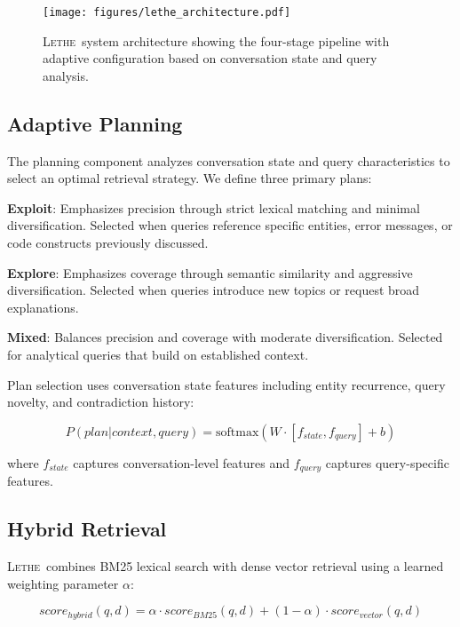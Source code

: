 \documentclass[letterpaper]{article}
\newcommand{\lethe}{\textsc{Lethe}}
\begin{document}
\begin{figure}[t]
\centering
\texttt{[image: figures/lethe\_architecture.pdf]}
\caption{\lethe\ system architecture showing the four-stage pipeline with adaptive configuration based on conversation state and query analysis.}
\label{fig:architecture}
\end{figure}

\subsection{Adaptive Planning}

The planning component analyzes conversation state and query characteristics to select an optimal retrieval strategy. We define three primary plans:

\textbf{Exploit}: Emphasizes precision through strict lexical matching and minimal diversification. Selected when queries reference specific entities, error messages, or code constructs previously discussed.

\textbf{Explore}: Emphasizes coverage through semantic similarity and aggressive diversification. Selected when queries introduce new topics or request broad explanations.

\textbf{Mixed}: Balances precision and coverage with moderate diversification. Selected for analytical queries that build on established context.

Plan selection uses conversation state features including entity recurrence, query novelty, and contradiction history:

\begin{equation}
P(plan | context, query) = \text{softmax}(W \cdot [f_{state}, f_{query}] + b)
\end{equation}

where $f_{state}$ captures conversation-level features and $f_{query}$ captures query-specific features.

\subsection{Hybrid Retrieval}

\lethe\ combines BM25 lexical search with dense vector retrieval using a learned weighting parameter $\alpha$:

\begin{equation}
score_{hybrid}(q, d) = \alpha \cdot score_{BM25}(q, d) + (1 - \alpha) \cdot score_{vector}(q, d)
\end{equation}
\end{document}
